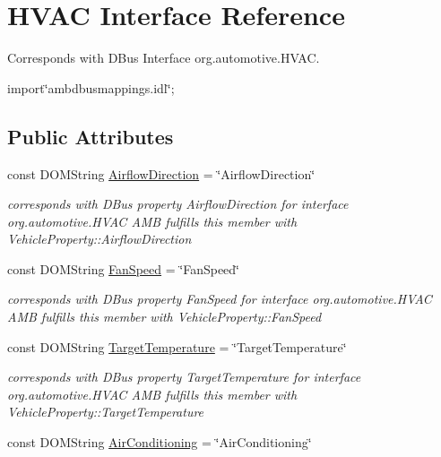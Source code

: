 \hypertarget{interfaceHVAC}{\section{H\+V\+A\+C Interface Reference}
\label{interfaceHVAC}
}


Corresponds with D\+Bus Interface org.\+automotive.\+H\+V\+A\+C.  




{\ttfamily import\char`\"{}ambdbusmappings.\+idl\char`\"{};}

\subsection*{Public Attributes}
\begin{DoxyCompactItemize}
\item 
\hypertarget{interfaceHVAC_a9c9da298987d1f7947e78bb494a5393a}{const D\+O\+M\+String \hyperlink{interfaceHVAC_a9c9da298987d1f7947e78bb494a5393a}{Airflow\+Direction} = \char`\"{}Airflow\+Direction\char`\"{}}\label{interfaceHVAC_a9c9da298987d1f7947e78bb494a5393a}

\begin{DoxyCompactList}\small\item\em corresponds with D\+Bus property Airflow\+Direction for interface org.\+automotive.\+H\+V\+A\+C A\+M\+B fulfills this member with Vehicle\+Property\+::\+Airflow\+Direction \end{DoxyCompactList}\item 
\hypertarget{interfaceHVAC_a58d0a4238baeec3d60616dce4f740a5d}{const D\+O\+M\+String \hyperlink{interfaceHVAC_a58d0a4238baeec3d60616dce4f740a5d}{Fan\+Speed} = \char`\"{}Fan\+Speed\char`\"{}}\label{interfaceHVAC_a58d0a4238baeec3d60616dce4f740a5d}

\begin{DoxyCompactList}\small\item\em corresponds with D\+Bus property Fan\+Speed for interface org.\+automotive.\+H\+V\+A\+C A\+M\+B fulfills this member with Vehicle\+Property\+::\+Fan\+Speed \end{DoxyCompactList}\item 
\hypertarget{interfaceHVAC_a822cb43250a25fecaca0721ac316ff6c}{const D\+O\+M\+String \hyperlink{interfaceHVAC_a822cb43250a25fecaca0721ac316ff6c}{Target\+Temperature} = \char`\"{}Target\+Temperature\char`\"{}}\label{interfaceHVAC_a822cb43250a25fecaca0721ac316ff6c}

\begin{DoxyCompactList}\small\item\em corresponds with D\+Bus property Target\+Temperature for interface org.\+automotive.\+H\+V\+A\+C A\+M\+B fulfills this member with Vehicle\+Property\+::\+Target\+Temperature \end{DoxyCompactList}\item 
\hypertarget{interfaceHVAC_afda1098bcd46867aff6f8d01ccad7927}{const D\+O\+M\+String \hyperlink{interfaceHVAC_afda1098bcd46867aff6f8d01ccad7927}{Air\+Conditioning} = \char`\"{}Air\+Conditioning\char`\"{}}\label{interfaceHVAC_afda1098bcd46867aff6f8d01ccad7927}


\end{DoxyCompactItemize}
